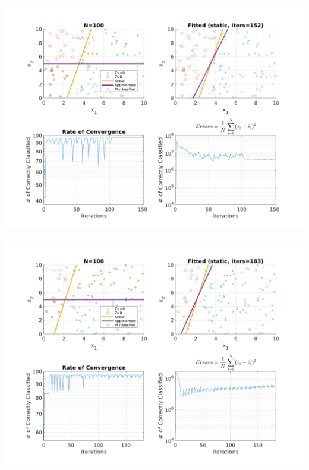 \documentclass{article}
\newenvironment{Figure}
  {\par\medskip\noindent\minipage{\linewidth}}
  {\endminipage\par\medskip}
\begin{document}
\begin{multicols}{2}
\begin{Figure}
\end{Figure}
\begin{Figure}
\centering
\includegraphics[width=\linewidth]{pngs/n100_static4.png}
\end{Figure}
\begin{Figure}
\centering
\includegraphics[width=\linewidth]{pngs/n100_static5.png}
\end{Figure}


\end{multicols}
\end{document}
